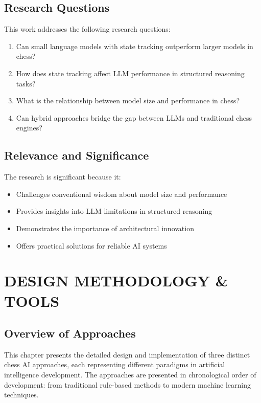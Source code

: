 \documentclass[11pt,a4paper]{report}
\begin{document}
\section{Research Questions}
This work addresses the following research questions:
\begin{enumerate}
    \item Can small language models with state tracking outperform larger models in chess?
    \item How does state tracking affect LLM performance in structured reasoning tasks?
    \item What is the relationship between model size and performance in chess?
    \item Can hybrid approaches bridge the gap between LLMs and traditional chess engines?
\end{enumerate}

\section{Relevance and Significance}
The research is significant because it:
\begin{itemize}
    \item Challenges conventional wisdom about model size and performance
    \item Provides insights into LLM limitations in structured reasoning
    \item Demonstrates the importance of architectural innovation
    \item Offers practical solutions for reliable AI systems
\end{itemize}

\chapter{DESIGN METHODOLOGY \& TOOLS}
\thispagestyle{fancy}

\section{Overview of Approaches}
This chapter presents the detailed design and implementation of three distinct chess AI approaches, each representing different paradigms in artificial intelligence development. The approaches are presented in chronological order of development: from traditional rule-based methods to modern machine learning techniques.
\end{document}
